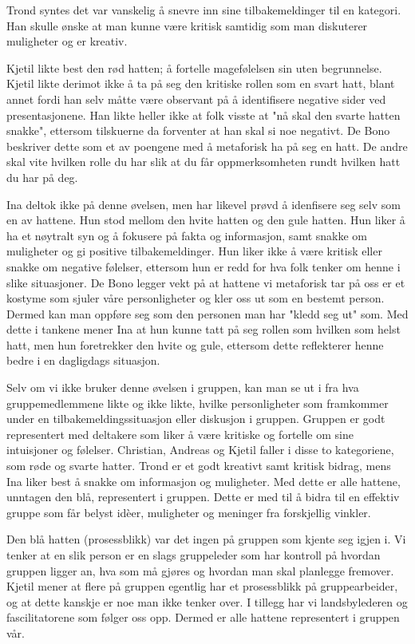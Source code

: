 Trond syntes det var vanskelig å snevre inn sine tilbakemeldinger til en kategori. Han skulle ønske at man kunne være kritisk samtidig som man diskuterer muligheter og er kreativ. 

Kjetil likte best den rød hatten; å fortelle magefølelsen sin uten begrunnelse. Kjetil likte derimot ikke å ta på seg den kritiske rollen som en svart hatt, blant annet fordi han selv måtte være observant på å identifisere negative sider ved presentasjonene. Han likte heller ikke at folk visste at "nå skal den svarte hatten snakke", ettersom tilskuerne da forventer at han skal si noe negativt. De Bono beskriver dette som et av poengene med å metaforisk ha på seg en hatt. De andre skal vite hvilken rolle du har slik at du får oppmerksomheten rundt hvilken hatt du har på deg. 

Ina deltok ikke på denne øvelsen, men har likevel prøvd å idenfisere seg selv som en av hattene. Hun stod mellom den hvite hatten og den gule hatten. Hun liker å ha et nøytralt syn og å fokusere på fakta og informasjon, samt snakke om muligheter og gi positive tilbakemeldinger. Hun liker ikke å være kritisk eller snakke om negative følelser, ettersom hun er redd for hva folk tenker om henne i slike situasjoner. De Bono legger vekt på at hattene vi metaforisk tar på oss er et kostyme som sjuler våre personligheter og kler oss ut som en bestemt person. Dermed kan man oppføre seg som den personen man har "kledd seg ut" som. Med dette i tankene mener Ina at hun kunne tatt på seg rollen som hvilken som helst hatt, men hun foretrekker den hvite og gule, ettersom dette reflekterer henne bedre i en dagligdags situasjon.

Selv om vi ikke bruker denne øvelsen i gruppen, kan man se ut i fra hva gruppemedlemmene likte og ikke likte, hvilke personligheter som framkommer under en tilbakemeldingssituasjon eller diskusjon i gruppen. Gruppen er godt representert med deltakere som liker å være kritiske og fortelle om sine intuisjoner og følelser. Christian, Andreas og Kjetil faller i disse to kategoriene, som røde og svarte hatter. Trond er et godt kreativt samt kritisk bidrag, mens Ina liker best å snakke om informasjon og muligheter. Med dette er alle hattene, unntagen den blå, representert i gruppen. Dette er med til å bidra til en effektiv gruppe som får belyst idèer, muligheter og meninger fra forskjellig vinkler. 

Den blå hatten (prosessblikk) var det ingen på gruppen som kjente seg igjen i. Vi tenker at en slik person er en slags gruppeleder som har kontroll på hvordan gruppen ligger an, hva som må gjøres og hvordan man skal planlegge fremover. Kjetil mener at flere på gruppen egentlig har et prosessblikk på gruppearbeider, og at dette kanskje er noe man ikke tenker over. I tillegg har vi landsbylederen og fascilitatorene som følger oss opp. Dermed er alle hattene representert i gruppen vår.


